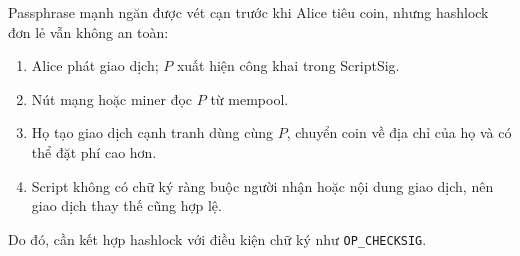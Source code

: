 Passphrase mạnh ngăn được vét cạn trước khi Alice tiêu coin, nhưng hashlock đơn
lẻ vẫn không an toàn:
\begin{enumerate}[nosep]
  \item Alice phát giao dịch; $P$ xuất hiện công khai trong ScriptSig.
  \item Nút mạng hoặc miner đọc $P$ từ mempool.
  \item Họ tạo giao dịch cạnh tranh dùng cùng $P$, chuyển coin về địa chỉ của
        họ và có thể đặt phí cao hơn.
  \item Script không có chữ ký ràng buộc người nhận hoặc nội dung giao dịch,
        nên giao dịch thay thế cũng hợp lệ.
\end{enumerate}
Do đó, cần kết hợp hashlock với điều kiện chữ ký như \texttt{OP\_CHECKSIG}.
